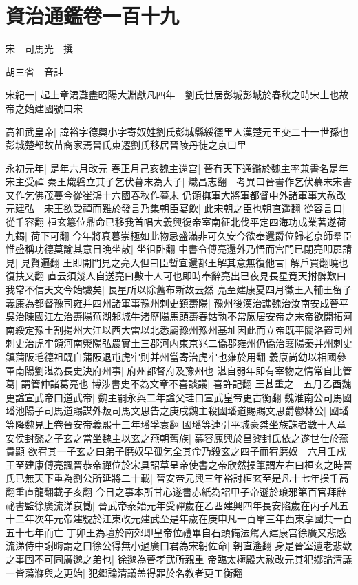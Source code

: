 \chapter{資治通鑑卷一百十九}


宋　司馬光　撰

胡三省　音註

宋紀一|{
	起上章涒灘盡昭陽大淵獻凡四年　劉氏世居彭城彭城於春秋之時宋土也故帝之始建國號曰宋}


高祖武皇帝|{
	諱裕字德輿小字寄奴姓劉氏彭城縣綏德里人漢楚元王交二十一世孫也彭城楚都故苗裔家焉晉氏東遷劉氏移居晉陵丹徒之京口里}


永初元年|{
	是年六月改元}
春正月己亥魏主還宫|{
	晉有天下通鑑於魏主率兼書名是年宋主受禪}
秦王熾磐立其子乞伏暮末為大子|{
	熾昌志翻　考異曰晉書作乞伏慕末宋書又作乞佛茂蔓今從崔鴻十六國春秋作暮末}
仍領撫軍大將軍都督中外諸軍事大赦改元建弘　宋王欲受禪而難於發言乃集朝臣宴飲|{
	此宋朝之臣也朝直遥翻}
從容言曰|{
	從千容翻}
桓玄簒位鼎命已移我首唱大義興復帝室南征北伐平定四海功成業著遂荷九錫|{
	荷下可翻}
今年將衰暮崇極如此物忌盛滿非可久安今欲奉還爵位歸老京師羣臣惟盛稱功德莫諭其意日晩坐散|{
	坐徂卧翻}
中書令傅亮還外乃悟而宫門已閉亮叩扉請見|{
	見賢遍翻}
王即開門見之亮入但曰臣暫宜還都王解其意無復他言|{
	解戶買翻曉也復扶又翻}
直云須幾人自送亮曰數十人可也即時奉辭亮出已夜見長星竟天拊髀歎曰我常不信天文今始驗矣|{
	長星所以除舊布新故云然}
亮至建康夏四月徵王入輔王留子義康為都督豫司雍并四州諸軍事豫州刺史鎮夀陽|{
	豫州後漢治譙魏治汝南安成晉平吳治陳國江左治夀陽蕪湖邾城牛渚歷陽馬頭夀春姑孰不常厥居安帝之末帝欲開拓河南綏定豫土割揚州大江以西大雷以北悉屬豫州豫州基址因此而立帝既平關洛置司州刺史治虎牢領河南滎陽弘農實土三郡河内東京兆二僑郡雍州仍僑治襄陽秦并州刺史鎮蒲阪毛德祖既自蒲阪退屯虎牢則并州當寄治虎牢也雍於用翻}
義康尚幼以相國參軍南陽劉湛為長史決府州事|{
	府州都督府及豫州也}
湛自弱年即有宰物之情常自比管葛|{
	謂管仲諸葛亮也}
博涉書史不為文章不喜談議|{
	喜許記翻}
王甚重之　五月乙酉魏更諡宣武帝曰道武帝|{
	魏主嗣永興二年諡父珪曰宣武皇帝更古衡翻}
魏淮南公司馬國璠池陽子司馬道賜謀外叛司馬文思告之庚戌魏主殺國璠道賜賜文思爵鬱林公|{
	國璠等降魏見上卷晉安帝義熙十三年璠孚袁翻}
國璠等連引平城豪桀坐族誅者數十人章安侯封懿之子玄之當坐魏主以玄之燕朝舊族|{
	慕容廆興於昌黎封氏依之遂世仕於燕貴顯}
欲宥其一子玄之曰弟子磨奴早孤乞全其命乃殺玄之四子而宥磨奴　六月壬戌王至建康傅亮諷晉恭帝禪位於宋具詔草呈帝使書之帝欣然操筆謂左右曰桓玄之時晉氏已無天下重為劉公所延將二十載|{
	晉安帝元興三年裕討桓玄至是凡十七年操千高翻重直龍翻載子亥翻}
今日之事本所甘心遂書赤紙為詔甲子帝遜於琅邪第百官拜辭祕書監徐廣流涕哀慟|{
	晉武帝泰始元年受禪歲在乙酉建興四年長安陷歲在丙子凡五十二年次年元帝建號於江東改元建武至是年歲在庚申凡一百單三年西東享國共一百五十七年而亡}
丁卯王為壇於南郊即皇帝位禮畢自石頭備法駕入建康宫徐廣又悲感流涕侍中謝晦謂之曰徐公得無小過廣曰君為宋朝佐命|{
	朝直遙翻}
身是晉室遺老悲歡之事固不可同廣邈之弟也|{
	徐邈為晉孝武所親重}
帝臨太極殿大赦改元其犯鄉論清議一皆蕩滌與之更始|{
	犯郷論清議盖得罪於名教者更工衡翻}


